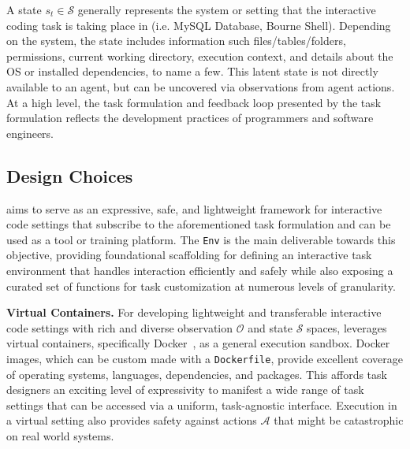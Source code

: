 A state $s_t \in \mathcal{S}$ generally represents the system or setting that the interactive coding task is taking place in (i.e. MySQL Database, Bourne Shell). Depending on the system, the state includes information such files/tables/folders, permissions, current working directory, execution context, and details about the OS or installed dependencies, to name a few. This latent state is not directly available to an agent, but can be uncovered via observations from agent actions. At a high level, the task formulation and feedback loop presented by the \benchmark{} task formulation reflects the development practices of programmers and software engineers.



\subsection{Design Choices}
\label{sec:benchmark:principles} \benchmark{} aims to serve as an expressive, safe, and lightweight framework for interactive code settings that subscribe to the aforementioned task formulation and can be used as a tool or training platform.
The \texttt{\benchmark{}Env} is the main deliverable towards this objective, providing foundational scaffolding for defining an interactive task environment that handles interaction efficiently and safely while also exposing a curated set of functions for task customization at numerous levels of granularity.

\textbf{Virtual Containers.} For developing lightweight and transferable interactive code settings with rich and diverse observation $\mathcal{O}$ and state $\mathcal{S}$ spaces, \benchmark{} leverages virtual containers, specifically Docker~\cite{merkel2014docker}, as a general execution sandbox.
Docker images, which can be custom made with a \texttt{Dockerfile}, provide excellent coverage of operating systems, languages, dependencies, and packages.
This affords task designers an exciting level of expressivity to manifest a wide range of task settings that can be accessed via a uniform, task-agnostic interface.
Execution in a virtual setting also provides safety against actions $\mathcal{A}$ that might be catastrophic on real world systems.


